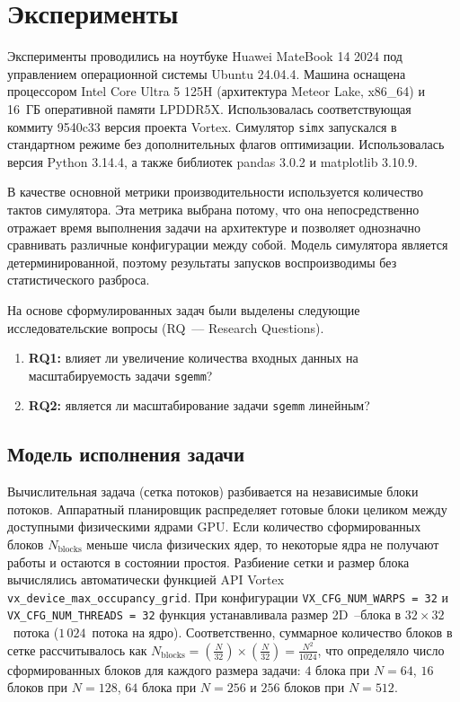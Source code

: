\documentclass[a4paper]{article}
\begin{document}
\section{Эксперименты} 

Эксперименты проводились на ноутбуке Huawei MateBook 14 2024 под управлением операционной системы Ubuntu 24.04.4. Машина оснащена процессором Intel Core Ultra 5 125H (архитектура Meteor Lake, x86\_64) и 16~ГБ оперативной памяти LPDDR5X. Использовалась соответствующая коммиту 9540c33 версия проекта Vortex. Симулятор \texttt{simx} запускался в стандартном режиме без дополнительных флагов оптимизации. Использовалась версия Python 3.14.4,  а также библиотек pandas 3.0.2 и matplotlib 3.10.9.

В качестве основной метрики производительности используется количество тактов симулятора. Эта метрика выбрана потому, что она непосредственно отражает время выполнения задачи на архитектуре и позволяет однозначно сравнивать различные конфигурации между собой. Модель симулятора является детерминированной, поэтому результаты запусков воспроизводимы без статистического разброса.

На основе сформулированных задач были выделены следующие исследовательские вопросы (RQ~--- Research Questions).
\begin{enumerate}
    \item \textbf{RQ1:} влияет ли увеличение количества входных данных на масштабируемость задачи \texttt{sgemm}?
    \item \textbf{RQ2:} является ли масштабирование задачи \texttt{sgemm} линейным?
\end{enumerate}

\subsection{Модель исполнения задачи}
Вычислительная задача (сетка потоков) разбивается на независимые блоки потоков. Аппаратный планировщик распределяет готовые блоки целиком между доступными физическими ядрами GPU. Если количество сформированных блоков $N_{\text{blocks}}$ меньше числа физических ядер, то некоторые ядра не получают работы и остаются в состоянии простоя. Разбиение сетки и размер блока вычислялись автоматически функцией API Vortex \texttt{vx\_device\_max\_occupancy\_grid}. При конфигурации \texttt{VX\_CFG\_NUM\_WARPS = 32} и \texttt{VX\_CFG\_NUM\_THREADS = 32} функция устанавливала размер 2D~--блока в $32\times32$~потока ($1\,024$~потока на ядро). Соответственно, суммарное количество блоков в сетке рассчитывалось как $N_{\text{blocks}} = \left(\frac{N}{32}\right) \times \left(\frac{N}{32}\right) = \frac{N^2}{1024}$, что определяло число сформированных блоков для каждого размера задачи: $4$ блока при $N = 64$, $16$ блоков при $N = 128$, $64$ блока при $N = 256$ и $256$ блоков при $N = 512$.
\end{document}
